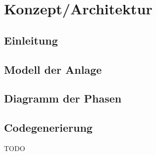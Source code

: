 
\chapter{Konzept/Architektur} \label{chapter:architecture}


\section{Einleitung}
\section{Modell der Anlage}
\section{Diagramm der Phasen}
\section{Codegenerierung}


TODO